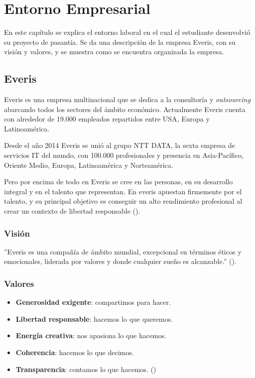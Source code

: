 \chapter{Entorno Empresarial}
\label{capitulo1}

En este capítulo se explica el entorno laboral en el cual el
estudiante desenvolvió su proyecto de pasantía. Se da una descripción
de la empresa Everis, con su visión y valores, y se muestra
como se encuentra organizada la empresa.


\section{Everis}

Everis es una empresa multinacional que se dedica a la consultoría y
\emph{outsourcing} abarcando todos los sectores del ámbito económico.
Actualmente Everis cuenta con alrededor de 19.000
empleados repartidos entre USA, Europa y Latinoamérica.

Desde el año 2014 Everis se unió al grupo NTT DATA, la sexta empresa de
servicios IT del mundo, con 100.000 profesionales y presencia en Asia-Pacífico,
Oriente Medio, Europa, Latinoamérica y Norteamérica.

Pero por encima de todo en Everis se cree en las personas, en su desarrollo integral y en
el talento que representan. En everis apuestan firmemente por el talento, y
su principal objetivo es conseguir un alto rendimiento profesional al crear
un contexto de libertad responsable (\cite{EVERIS}).

\subsection{Visión}

''Everis es una compañía de ámbito mundial, excepcional en términos éticos y
emocionales, liderada por valores y donde cualquier sueño es alcanzable.'' (\cite{EVERIS}).

\subsection{Valores}

\begin{itemize}
  \item \textbf{Generosidad exigente}: compartimos para hacer.
  \item \textbf{Libertad responsable}: hacemos lo que queremos.
  \item \textbf{Energía creativa}: nos apasiona lo que hacemos.
  \item \textbf{Coherencia}: hacemos lo que decimos.
  \item \textbf{Transparencia}: contamos lo que hacemos. (\cite{EVERIS})
\end{itemize}

